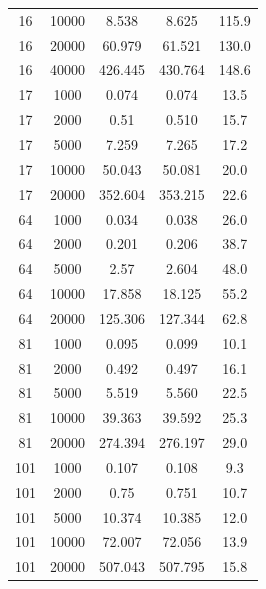 \begin{small}
\begin{center}
\begin{longtable}{|c|c|c|c|c|}
16&10000&8.538&8.625&115.9\\
16&20000&60.979&61.521&130.0\\
16&40000&426.445&430.764&148.6\\
17&1000&0.074&0.074&13.5\\
17&2000&0.51&0.510&15.7\\
17&5000&7.259&7.265&17.2\\
17&10000&50.043&50.081&20.0\\
17&20000&352.604&353.215&22.6\\
64&1000&0.034&0.038&26.0\\
64&2000&0.201&0.206&38.7\\
64&5000&2.57&2.604&48.0\\
64&10000&17.858&18.125&55.2\\
64&20000&125.306&127.344&62.8\\
81&1000&0.095&0.099&10.1\\
81&2000&0.492&0.497&16.1\\
81&5000&5.519&5.560&22.5\\
81&10000&39.363&39.592&25.3\\
81&20000&274.394&276.197&29.0\\
101&1000&0.107&0.108&9.3\\
101&2000&0.75&0.751&10.7\\
101&5000&10.374&10.385&12.0\\
101&10000&72.007&72.056&13.9\\
101&20000&507.043&507.795&15.8\\
  \end{longtable}
\end{center}
  

\end{small}
